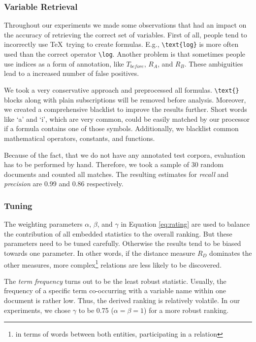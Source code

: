 \documentclass[runningheads]{llncs}
\begin{document}
\subsubsection{Variable Retrieval}
\label{vr}
Throughout our experiments we made some observations that had an impact on the accuracy of retrieving the correct set of variables. First of all, people tend to incorrectly use \TeX\ trying to create formulas. E.g., \texttt{\textbackslash text\{log\}} is more often used than the correct operator \texttt{\textbackslash log}. Another problem is that sometimes people use indices as a form of annotation, like $T_{before}$, $R_{A}$, and $R_{B}$. These ambiguities lead to a increased number of false positives.

We took a very conservative approach and preprocessed all formulas. \texttt{\textbackslash text\{\}} blocks along with plain subscriptions will be removed before analysis. Moreover, we created a comprehensive blacklist to improve the results further. Short words like `a' and `i', which are very common, could be easily matched by our processor if a formula contains one of those symbols. Additionally, we blacklist common mathematical operators, constants, and functions.

Because of the fact, that we do not have any annotated test corpora, evaluation has to be performed by hand. Therefore, we took a sample of 30 random documents and counted all matches. The resulting estimates for \emph{recall} and \emph{precision} are 0.99 and 0.86 respectively.



\subsubsection{Tuning}
The weighting parameters $\alpha$, $\beta$, and $\gamma$ in Equation \ref{eq:rating} are used to balance the contribution of all embedded statistics to the overall ranking. But these parameters need to be tuned carefully. Otherwise the results tend to be biased towards one parameter. In other words, if the distance measure $R_{D}$ dominates the other measures, more complex\footnote{in terms of words between both entities, participating in a relation} relations are less likely to be discovered.

The \emph{term frequency} turns out to be the least robust statistic. Usually, the frequency of a specific term co-occurring with a variable name within one document is rather low. Thus, the derived ranking is relatively volatile. In our experiments, we chose $\gamma$ to be 0.75 ($\alpha = \beta = 1$) for a more robust ranking.
\end{document}
